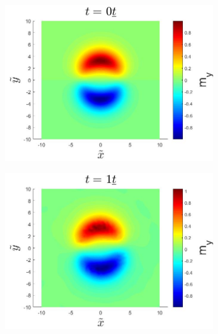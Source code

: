\begin{figure}[h!]
\begin{subfigure}{.3\textwidth}
  \centering
  \includegraphics[width=\linewidth]{Figures/StaticSkyrmionMyT0.jpg}
  \caption{}
  \label{fig:StaticSkyrmionMyT0}
\end{subfigure}
\begin{subfigure}{.3\textwidth}
  \centering
  \includegraphics[width=\linewidth]{Figures/StaticSkyrmionMyT1.jpg}
  \caption{}
  \label{fig:StaticSkyrmionMyT1}
\end{subfigure}
\begin{subfigure}{.3\textwidth}
  \centering

\end{subfigure}
\end{figure}

